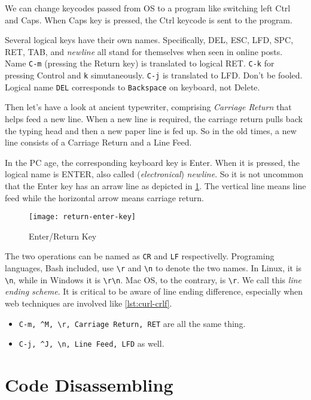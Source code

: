 We can change keycodes passed from OS to a program like switching
left Ctrl and Caps. When Caps key is pressed, the Ctrl keycode is
sent to the program.

Several logical keys have their own names. Specifically, DEL, ESC,
LFD, SPC, RET, TAB, and \textit{newline} all stand for themselves
when seen in online posts. Name \verb|C-m| (pressing the
Return key) is translated to logical RET. \verb|C-k| for
pressing Control and \verb|k| simutaneously. \verb|C-j| is
translated to LFD. Don't be fooled. Logical name \verb|DEL|
corresponds to \verb|Backspace| on keyboard, not Delete.

Then let's have a look at ancient typewriter, comprising
\textit{Carriage Return} that helps feed a new line. When a new
line is required, the carriage return pulls back the typing head
and then a new paper line is fed up. So in the old times, a new
line consists of a Carriage Return and a Line Feed.

In the PC age, the corresponding keyboard key is Enter. When it is
pressed, the logical name is ENTER, also called
(\textit{electronical}) \textit{newline}. So it is not uncommon
that the Enter key has an arraw line as depicted in
\ref{fig:enter-return-key}. The vertical line means line feed
while the horizontal arrow means carriage return.

\begin{figure}
  \centering
  \texttt{[image: return-enter-key]}
  \caption{Enter/Return Key}
  \label{fig:enter-return-key}
\end{figure}

The two operations can be named as \verb|CR| and \verb|LF|
respectivelly. Programing languages, Bash included, use
\lstinline|\r| and \lstinline|\n| to denote the two names. In
Linux, it is \verb|\n|, while in Windows it is \verb|\r\n|. Mac
OS, to the contrary, is \verb|\r|. We call this \textit{line
  ending scheme}. It is critical to be aware of line ending
difference, especially when web techniques are involved like
\ref{lst:curl-crlf}.

\begin{itemize}
\item \verb|C-m, ^M, \r, Carriage Return, RET| are all the same
  thing.
\item \verb|C-j, ^J, \n, Line Feed, LFD| as well.
\end{itemize}

\section{Code Disassembling}
\label{sec:bash-code-disassembling}

